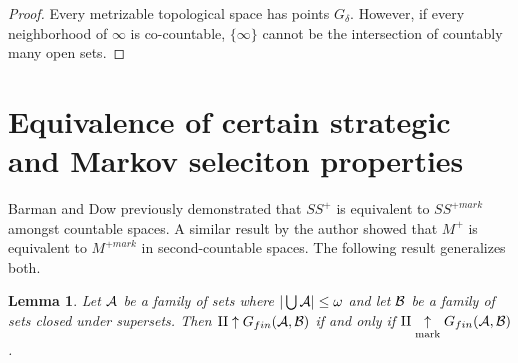 \documentclass{amsart}
\theoremstyle{plain}
\newtheorem{lemma}[theorem]{Lemma}
\theoremstyle{definition}
\theoremstyle{remark}
\theoremstyle{plain}
\theoremstyle{definition}
\theoremstyle{remark}
\begin{document}
\begin{proof}
  Every metrizable topological space has points \(G_\delta\).
  However, if every neighborhood of \(\infty\) is
  co-countable, \(\{\infty\}\) cannot be the intersection of countably many
  open sets.
\end{proof}


\section{Equivalence of certain strategic and Markov seleciton properties}

Barman and Dow
previously demonstrated that \(SS^+\) is equivalent to
\(SS^{+mark}\) amongst countable spaces.
A similar result by the author
showed that \(M^+\) is equivalent to \(M^{+mark}\) in second-countable
spaces. The following result generalizes both.

\begin{lemma}\label{mainLemma}
  Let \(\mathcal{A}\) be a family of sets where
  \(|\bigcup\mathcal{A}|\leq\omega\)
  and let \(\mathcal{B}\) be a family of sets closed under supersets. Then
  \(\mathrm{II}\uparrow G_{fin}(\mathcal{A},\mathcal{B})\) if and only if
  \(\mathrm{II}\underset{\text{mark}}{\uparrow}G_{fin}(\mathcal{A},\mathcal{B})\).
\end{lemma}
\end{document}
